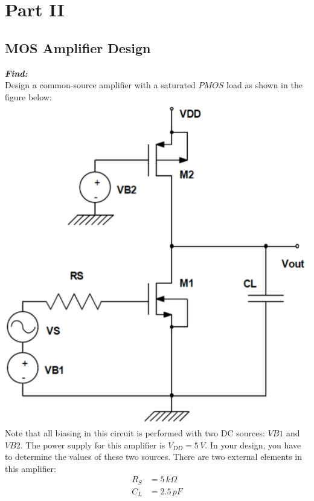 \documentclass[12pt, fleqn]{article}
\begin{document}
\section{Part II}
\subsection{MOS Amplifier Design}
\textbf{\emph{Find: }}\\[0.25cm]\noindent
Design a common-source amplifier with a saturated $PMOS$ load as shown in the figure below:\\[0.25cm]
\includegraphics[scale=0.25, center]{p2pmos.PNG}\\
\noindent
Note that all biasing in this circuit is performed with two DC sources: $VB1$ and $VB2$. The power supply for this amplifier is $V_{DD} = 5\,V$. In your design, you have to determine the values of these two sources. There are two external elements in this amplifier:
\begin{align*}
    R_S &= 5\,k\Omega\\[0.25cm]
    C_L &= 2.5\,pF
\end{align*}
\end{document}
